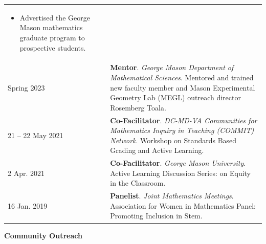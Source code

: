 \begin{center}
{\begin{longtable}{p{}  p{}}
        {\small
        \begin{itemize}
        \setlength{\parindent}{0em}
        \item[] Advertised the George Mason mathematics graduate program to prospective students.
        \end{itemize}
        }
        \vspace{-1em}
         \\ 
  Spring 2023 & \textbf{Mentor}. \textit{George Mason Department of Mathematical Sciences}.  Mentored and trained new faculty member and Mason Experimental Geometry Lab (MEGL) outreach director Rosemberg Toala.  \\ 
21  -- 22 May  2021 & \textbf{Co-Facilitator}. \textit{DC-MD-VA Communities for Mathematics Inquiry in Teaching (COMMIT) Network}.  Workshop on Standards Based Grading and Active Learning.  \\ 
2 Apr.  2021 & \textbf{Co-Facilitator}. \textit{George Mason University}.  Active Learning Discussion Series: on Equity in the Classroom.  \\ 
16 Jan.  2019 & \textbf{Panelist}. \textit{Joint Mathematics Meetings}.  Association for Women in Mathematics Panel: Promoting Inclusion in Stem.  
    \end{longtable}
    } 
    \end{center}

    \vspace{-1em}
    

    \textbf{\large Community Outreach}
    
